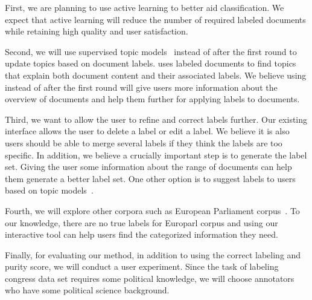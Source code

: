 
First, we are planning to use active learning to better aid classification. We
expect that active learning will reduce the number of required labeled documents
while retaining high quality and user satisfaction.

Second, we will use supervised topic models~\cite[]{slda} instead of  after the first round to update topics
based on document labels.  uses
labeled documents to find topics that explain both document content and their associated labels.
We believe using  instead of  after the first round will give users more information about the overview of documents and help them further for applying labels to documents.

Third, we want to allow the user to refine and correct labels further. Our existing
interface allows the user to delete a label or edit a label. We believe it is also
users should be able to merge several labels if they think the labels are too specific.
 In addition, we believe a crucially important step is to generate the label set.
 Giving the user some information about the range of documents can help them
 generate a better label set. One other option is to suggest labels to users based
 on topic models~\cite{lau-10}.

Fourth, we will explore other corpora such as European Parliament corpus~\cite{europarl_corpus}. To our knowledge, there are no true labels for Europarl corpus and using our interactive tool can help users find the categorized information they need.

Finally, for evaluating our method, in addition to using the correct labeling and purity score,
we will conduct a user experiment. Since the task of
labeling congress data set requires some political
knowledge, we will choose annotators who have some political
science background.